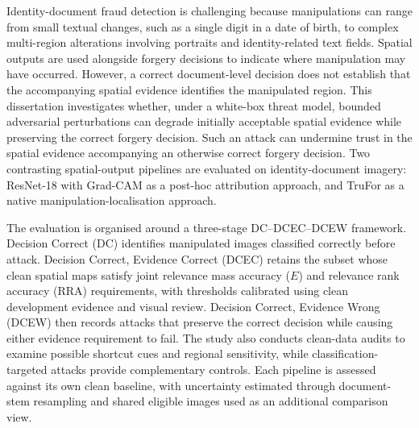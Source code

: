 

Identity-document fraud detection is challenging because manipulations can range from small textual changes, such as a single digit in a date of birth, to complex multi-region alterations involving portraits and identity-related text fields. Spatial outputs are used alongside forgery decisions to indicate where manipulation may have occurred. However, a correct document-level decision does not establish that the accompanying spatial evidence identifies the manipulated region. This dissertation investigates whether, under a white-box threat model, bounded adversarial perturbations can degrade initially acceptable spatial evidence while preserving the correct forgery decision. Such an attack can undermine trust in the spatial evidence accompanying an otherwise correct forgery decision. Two contrasting spatial-output pipelines are evaluated on identity-document imagery: ResNet-18 with Grad-CAM as a post-hoc attribution approach, and TruFor as a native manipulation-localisation approach.

The evaluation is organised around a three-stage DC--DCEC--DCEW framework. Decision Correct (DC) identifies manipulated images classified correctly before attack. Decision Correct, Evidence Correct (DCEC) retains the subset whose clean spatial maps satisfy joint relevance mass accuracy ($E$) and relevance rank accuracy (RRA) requirements, with thresholds calibrated using clean development evidence and visual review. Decision Correct, Evidence Wrong (DCEW) then records attacks that preserve the correct decision while causing either evidence requirement to fail. The study also conducts clean-data audits to examine possible shortcut cues and regional sensitivity, while classification-targeted attacks provide complementary controls. Each pipeline is assessed against its own clean baseline, with uncertainty estimated through document-stem resampling and shared eligible images used as an additional comparison view.

